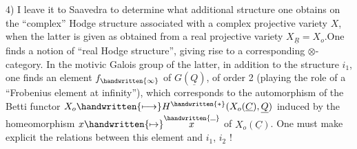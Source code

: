 4) I leave it to Saavedra to determine what additional structure one obtains on the ``complex'' Hodge structure associated with a  complex projective variety $X$, when the latter is given as obtained from a real projective variety $X_{\underline{R}}=X_o$.One finds a notion of ``real Hodge structure'', giving rise to a corresponding $\otimes$-category. In the motivic Galois group of the latter, in addition to the structure $i_1$, one finds an element $f_{\handwritten{\infty}}$ of $G(\underline{Q})$,  of order 2 (playing the role of a ``Frobenius element at infinity''), which corresponds to the automorphism of the Betti functor $X_o\handwritten{\longmapsto} H^{\handwritten{*}}(X_o(\underline{C}),\underline{Q})$ induced by the homeomorphism $x\handwritten{\mapsto}\overset{\handwritten{\rule{.55em}{.35pt}}}{x}$ of $X_o(\underline{C})$. One must make explicit the relations between this element and $i_1$, $i_2$ !
